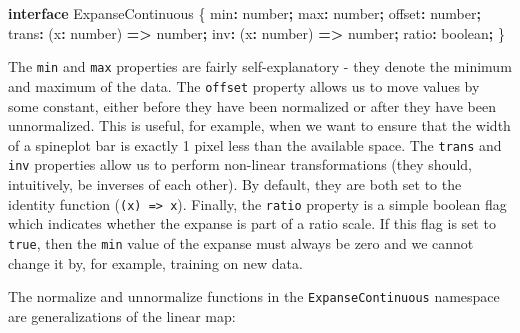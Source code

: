 \documentclass[
]{book}
\newenvironment{Shaded}{\begin{snugshade}}{\end{snugshade}}
\newcommand{\DataTypeTok}[1]{\textcolor[rgb]{0.13,0.29,0.53}{#1}}
\newcommand{\KeywordTok}[1]{\textcolor[rgb]{0.13,0.29,0.53}{\textbf{#1}}}
\newcommand{\NormalTok}[1]{#1}
\newcommand{\OperatorTok}[1]{\textcolor[rgb]{0.81,0.36,0.00}{\textbf{#1}}}
\theoremstyle{definition}
\theoremstyle{definition}
\theoremstyle{definition}
\theoremstyle{definition}
\theoremstyle{remark}
\begin{document}
\begin{Shaded}
\begin{Highlighting}[]
\KeywordTok{interface}\NormalTok{ ExpanseContinuous \{}
\NormalTok{  min}\OperatorTok{:} \DataTypeTok{number}\OperatorTok{;}
\NormalTok{  max}\OperatorTok{:} \DataTypeTok{number}\OperatorTok{;}
\NormalTok{  offset}\OperatorTok{:} \DataTypeTok{number}\OperatorTok{;}
\NormalTok{  trans}\OperatorTok{:}\NormalTok{ (x}\OperatorTok{:} \DataTypeTok{number}\NormalTok{) }\KeywordTok{=\textgreater{}} \DataTypeTok{number}\OperatorTok{;}
\NormalTok{  inv}\OperatorTok{:}\NormalTok{ (x}\OperatorTok{:} \DataTypeTok{number}\NormalTok{) }\KeywordTok{=\textgreater{}} \DataTypeTok{number}\OperatorTok{;}
\NormalTok{  ratio}\OperatorTok{:} \DataTypeTok{boolean}\OperatorTok{;}
\NormalTok{\}}
\end{Highlighting}
\end{Shaded}

The \texttt{min} and \texttt{max} properties are fairly self-explanatory - they denote the minimum and maximum of the data. The \texttt{offset} property allows us to move values by some constant, either before they have been normalized or after they have been unnormalized. This is useful, for example, when we want to ensure that the width of a spineplot bar is exactly 1 pixel less than the available space. The \texttt{trans} and \texttt{inv} properties allow us to perform non-linear transformations (they should, intuitively, be inverses of each other). By default, they are both set to the identity function (\texttt{(x)\ =\textgreater{}\ x}). Finally, the \texttt{ratio} property is a simple boolean flag which indicates whether the expanse is part of a ratio scale. If this flag is set to \texttt{true}, then the \texttt{min} value of the expanse must always be zero and we cannot change it by, for example, training on new data.

The normalize and unnormalize functions in the \texttt{ExpanseContinuous} namespace are generalizations of the linear map:
\end{document}
